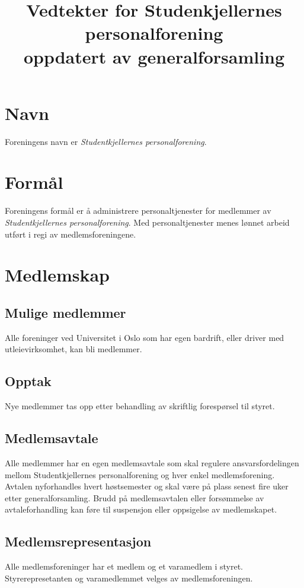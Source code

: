 \documentclass[11pt,norsk,a4paper]{article}
\author{}
\title{%
    {\LARGE\textbf{Vedtekter for Studenkjellernes personalforening}}\\%
	{\small oppdatert av generalforsamling \thedate}%
}
\date{}
\begin{document}
\maketitle{}

\section{Navn\label{sec:navn}}
Foreningens navn er \emph{Studentkjellernes personalforening}.


\section{Formål\label{sec:formål}}
Foreningens formål er å administrere personaltjenester for medlemmer av 
\emph{Studentkjellernes personalforening}.
Med personaltjenester menes lønnet arbeid utført i regi av medlemsforeningene.


\section{Medlemskap\label{sec:3}}

\subsection{Mulige medlemmer}
Alle foreninger ved Universitet i Oslo som  har egen bardrift, eller driver med utleievirksomhet, kan bli medlemmer.

\subsection{Opptak}
Nye medlemmer tas opp etter behandling av skriftlig forespørsel til styret.

\subsection{Medlemsavtale}
Alle medlemmer har en egen medlemsavtale som skal regulere ansvarsfordelingen
mellom Studentkjellernes personalforening og hver enkel medlemsforening.
Avtalen nyforhandles hvert høstsemester og skal være på plass senest
fire uker etter generalforsamling. 
Brudd på medlemsavtalen eller forsømmelse av avtaleforhandling
kan føre til suspensjon eller oppsigelse av medlemskapet.

\subsection{Medlemsrepresentasjon\label{sec:medlemsrepresentanter}}
Alle medlemsforeninger har et medlem og et varamedlem i styret.
Styrerepresetanten og varamedlemmet velges av medlemsforeningen.
\end{document}
